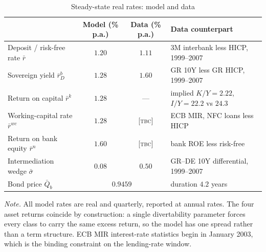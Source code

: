 \begin{table}[t]
\centering
\caption{Steady-state real rates: model and data}
\label{tab:rates}
\begin{tabular}{lccl}
\hline\hline
 & Model (\% p.a.) & Data (\% p.a.) & Data counterpart \\
\hline
Deposit / risk-free rate $\bar r$        & $1.20$ & $1.11$ & 3M interbank less HICP, 1999--2007 \\
Sovereign yield $\bar r^{b}_D$           & $1.28$ & $1.60$ & GR 10Y less GR HICP, 1999--2007 \\
Return on capital $\bar r^{k}$           & $1.28$ & ---    & implied $K/Y=2.22$, $I/Y=22.2$ vs $24.3$ \\
Working-capital rate $\bar r^{wc}$       & $1.28$ & [\textsc{tbc}] & ECB MIR, NFC loans less HICP \\
Return on bank equity $\bar r^{n}$       & $1.60$ & [\textsc{tbc}] & bank ROE less risk-free \\
\hline
Intermediation wedge $\bar\sigma$        & $0.08$ & $0.50$ & GR--DE 10Y differential, 1999--2007 \\
Bond price $\bar Q_b$                    & \multicolumn{2}{c}{$0.9459$} & duration $4.2$ years \\
\hline\hline
\end{tabular}

\smallskip
\begin{minipage}{0.92\textwidth}
\footnotesize \emph{Note.} All model rates are real and quarterly, reported at
annual rates. The four asset returns coincide by construction: a single
divertability parameter forces every class to carry the same excess return, so
the model has one spread rather than a term structure. ECB MIR interest-rate
statistics begin in January 2003, which is the binding constraint on the
lending-rate window.
\end{minipage}
\end{table}
